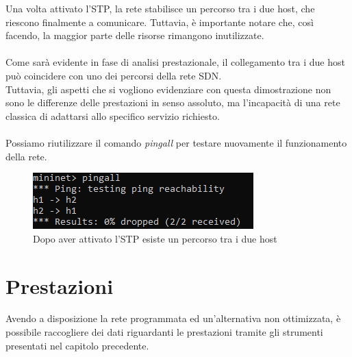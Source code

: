 Una volta attivato l'STP, la rete stabilisce un percorso tra i due host, che riescono finalmente a comunicare. Tuttavia, è importante notare che, così facendo, la maggior parte delle risorse rimangono inutilizzate.\\\\
Come sarà evidente in fase di analisi prestazionale, il collegamento tra i due host può coincidere con uno dei percorsi della rete SDN.\\
Tuttavia, gli aspetti che si vogliono evidenziare con questa dimostrazione non sono le differenze delle prestazioni in senso assoluto, ma l'incapacità di una rete classica di adattarsi allo specifico servizio richiesto.\\\\
Possiamo riutilizzare il comando \textit{pingall} per testare nuovamente il funzionamento della rete.
\begin{figure}[H]
	\centering
	\includegraphics[width=0.9\linewidth]{../immagini/esempio/stp_on}
	\caption[Pingall con STP attivato]{Dopo aver attivato l'STP esiste un percorso tra i due host}
	\label{fig:stpon}
\end{figure}

\section{Prestazioni}\label{ch:3.3}
Avendo a disposizione la rete programmata ed un'alternativa non ottimizzata, è possibile raccogliere dei dati riguardanti le prestazioni tramite gli strumenti presentati nel capitolo precedente.
